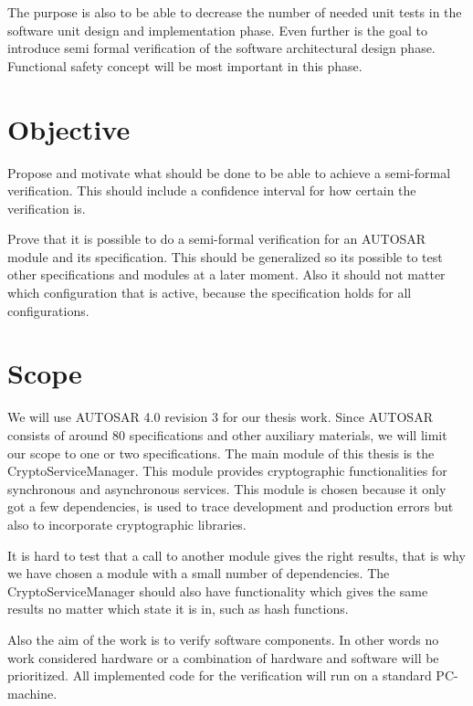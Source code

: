 The purpose is also to be able to decrease the number of needed unit tests in
the software unit design and implementation phase. Even further is the goal to
introduce semi formal verification of the software architectural design phase.
Functional safety concept will be most important in this phase.

\section{Objective}
Propose and motivate what should be done to be able to achieve a semi-formal
verification. This should include a confidence interval for how certain the
verification is.

Prove that it is possible to do a semi-formal verification for an AUTOSAR
module and its specification. This should be generalized so its possible to
test other specifications and modules at a later moment.  Also it should not
matter which configuration that is active, because the specification holds for
all configurations.

\section{Scope}
We will use AUTOSAR 4.0 revision 3 for our thesis work.
Since AUTOSAR consists of around 80 specifications and other auxiliary
materials\cite{AUTOSAR:URL}, we will limit our scope to one or two
specifications. The main module of this thesis is the CryptoServiceManager. This
module provides cryptographic functionalities for synchronous and asynchronous
services. This module is chosen because it only got a few dependencies, is used to trace
development and production errors but also to incorporate cryptographic
libraries.

It is hard to test that a call to another module gives the right results, that
is why we have chosen a module with a small number of dependencies.  The
CryptoServiceManager should also have functionality which gives the same
results no matter which state it is in, such as hash
functions\cite{SPEC:AUTOSAR:CSM}.

Also the aim of the work is to verify software components. In other words no
work considered hardware or a combination of hardware and software will be
prioritized. All implemented code for the verification will run on a standard
PC-machine.
